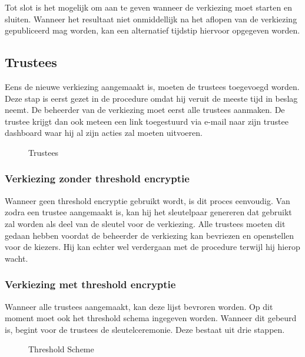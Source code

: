 \npar Tot slot is het mogelijk om aan te geven wanneer de verkiezing moet starten en sluiten. Wanneer het resultaat niet onmiddellijk na het aflopen van de verkiezing gepubliceerd mag worden, kan een alternatief tijdstip hiervoor opgegeven worden.

\subsection{Trustees}


Eens de nieuwe verkiezing aangemaakt is, moeten de trustees toegevoegd worden. Deze stap is eerst gezet in de procedure omdat hij veruit de meeste tijd in beslag neemt. De beheerder van de verkiezing moet eerst alle trustees aanmaken. De trustee krijgt dan ook meteen een link toegestuurd via e-mail naar zijn trustee dashboard waar hij al zijn acties zal moeten uitvoeren.

\begin{figure}
  \caption{Trustees}
  \label{fig:proc:trustees_view}
\end{figure}

\subsubsection{Verkiezing zonder threshold encryptie}


Wanneer geen threshold encryptie gebruikt wordt, is dit proces eenvoudig. Van zodra een trustee aangemaakt is, kan hij het sleutelpaar genereren dat gebruikt zal worden als deel van de sleutel voor de verkiezing. Alle trustees moeten dit gedaan hebben voordat de beheerder de verkiezing kan bevriezen en openstellen voor de kiezers. Hij kan echter wel verdergaan met de procedure terwijl hij hierop wacht.

\subsubsection{Verkiezing met threshold encryptie}

\npar Wanneer alle trustees aangemaakt, kan deze lijst bevroren worden. Op dit moment moet ook het threshold schema ingegeven worden. Wanneer dit gebeurd is, begint voor de trustees de sleutelceremonie. Deze bestaat uit drie stappen.

\begin{figure}
  \caption{Threshold Scheme}
  \label{fig:proc:trustees_freeze}
\end{figure}

